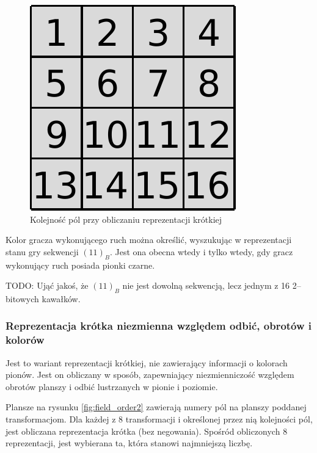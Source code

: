 \documentclass{scrartcl}
\begin{document}
\begin{figure}[h]
  \centering
  \includegraphics{data/field_order.pdf}
  \caption{Kolejność pól przy obliczaniu reprezentacji krótkiej}
  \label{fig:field_order}
\end{figure}

Kolor gracza wykonującego ruch można określić, wyszukując w
reprezentacji stanu gry sekwencji $(11)_B$. Jest ona obecna wtedy i
tylko wtedy, gdy gracz wykonujący ruch posiada pionki czarne.

TODO: Ująć jakoś, że $(11)_B$ nie jest dowolną sekwencją, lecz jednym
z 16 2--bitowych kawałków.

\subsubsection{Reprezentacja krótka niezmienna względem odbić,
  obrotów i kolorów}
Jest to wariant reprezentacji krótkiej, nie zawierający informacji 
o kolorach pionów. Jest on obliczany w sposób, zapewniający 
niezmienniczość względem obrotów planszy i odbić lustrzanych w pionie
i poziomie. 

Plansze na rysunku \ref{fig:field_order2} zawierają numery pól na
planszy poddanej transformacjom. Dla każdej z 8 transformacji i
określonej przez nią kolejności pól, jest obliczana reprezentacja 
krótka (bez negowania). Spośród obliczonych 8 reprezentacji, 
jest wybierana ta, która stanowi najmniejszą liczbę.
\end{document}
